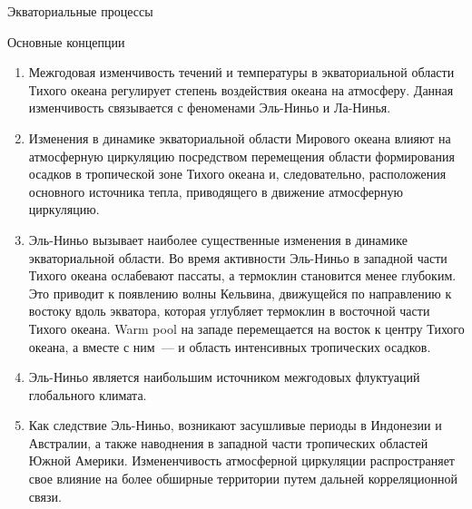 \begin{chapter}{Экваториальные процессы}
\begin{section}{Основные концепции}
\begin{enumerate}
\item
Межгодовая изменчивость течений и температуры в экваториальной области 
Тихого океана регулирует степень воздействия океана на атмосферу. Данная
изменчивость связывается с феноменами Эль-Ниньо и Ла-Нинья.
%

\item
Изменения в динамике экваториальной области Мирового океана влияют на
атмосферную циркуляцию посредством перемещения области формирования
осадков в тропической зоне Тихого океана и, следовательно, расположения
основного источника тепла, приводящего в движение атмосферную циркуляцию.
%

\item
Эль-Ниньо вызывает наиболее существенные изменения в динамике экваториальной
области. Во время активности Эль-Ниньо в западной части Тихого океана 
ослабевают пассаты, а термоклин становится 
менее глубоким. Это приводит к появлению волны 
Кельвина, движущейся по направлению к востоку вдоль 
экватора, которая углубляет термоклин в восточной части
Тихого океана. Warm pool на западе перемещается на восток к центру Тихого
океана, а вместе с ним~--- и область интенсивных тропических осадков.
%

\item
Эль-Ниньо является наибольшим источником межгодовых флуктуаций глобального
климата.
%

\item
Как следствие Эль-Ниньо, возникают засушливые периоды в Индонезии и
Австралии, а также наводнения в западной части тропических областей
Южной Америки. Измененчивость атмосферной циркуляции распространяет свое
влияние на более обширные территории путем дальней корреляционной связи.
%


\end{enumerate}
\end{section}
\end{chapter}
